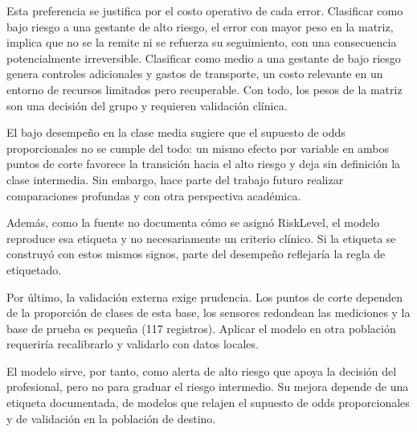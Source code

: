 Esta preferencia se justifica por el costo operativo de cada error. Clasificar
como bajo riesgo a una gestante de alto riesgo, el error con mayor peso en la
matriz, implica que no se la remite ni se refuerza su seguimiento, con una
consecuencia potencialmente irreversible. Clasificar como medio a una gestante de
bajo riesgo genera controles adicionales y gastos de transporte, un costo
relevante en un entorno de recursos limitados pero recuperable. Con todo, los
pesos de la matriz son una decisión del grupo y requieren validación clínica.

El bajo desempeño en la clase media sugiere que el supuesto de odds
proporcionales no se cumple del todo: un mismo efecto por variable en ambos
puntos de corte favorece la transición hacia el alto riesgo y deja sin definición
la clase intermedia. Sin embargo, hace parte del trabajo futuro realizar
comparaciones profundas y con otra perspectiva académica.

Además, como la fuente no documenta cómo se asignó RiskLevel, el modelo reproduce
esa etiqueta y no necesariamente un criterio clínico. Si la etiqueta se construyó
con estos mismos signos, parte del desempeño reflejaría la regla de etiquetado.

Por último, la validación externa exige prudencia. Los puntos de corte dependen
de la proporción de clases de esta base, los sensores redondean las mediciones y
la base de prueba es pequeña (117 registros). Aplicar el modelo en otra población
requeriría recalibrarlo y validarlo con datos locales.

El modelo sirve, por tanto, como alerta de alto riesgo que apoya la decisión del
profesional, pero no para graduar el riesgo intermedio. Su mejora depende de una
etiqueta documentada, de modelos que relajen el supuesto de odds proporcionales y
de validación en la población de destino.
